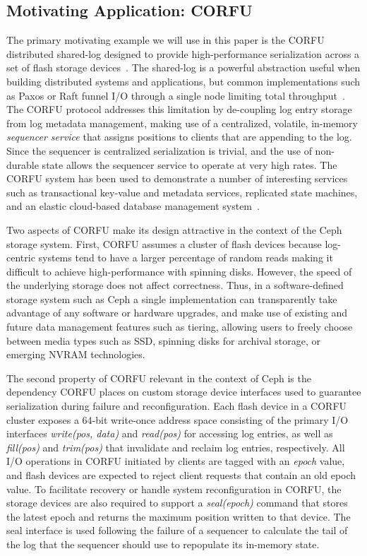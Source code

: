 \documentclass[10pt,twocolumn]{article}
\begin{document}
\subsection{Motivating Application: CORFU}

The primary motivating example we will use in this paper is the CORFU
distributed shared-log designed to provide high-performance serialization
across a set of flash storage devices~\cite{balakrishnan:nsdi12}. The
shared-log is a powerful abstraction useful when building distributed systems
and applications, but common implementations such as Paxos or Raft funnel I/O
through a single node limiting total throughput~\cite{lamport:tocs89}. The CORFU protocol addresses this limitation
by de-coupling log entry storage from log metadata management, making use of a
centralized, volatile, in-memory \emph{sequencer service} that assigns
positions to clients that are appending to the log. Since the sequencer is
centralized serialization is trivial, and the use of non-durable state allows
the sequencer service to operate at very high rates. The CORFU system has been
used to demonstrate a number of interesting services such as transactional
key-value and metadata services, replicated state machines, and an elastic
cloud-based database management system~\cite{balakrishnan:sosp13,bernstein:cidr11}.

Two aspects of CORFU make its design attractive in the context of the Ceph
storage system. First, CORFU assumes a cluster of flash devices because
log-centric systems tend to have a larger percentage of random reads making it
difficult to achieve high-performance with spinning disks. However, the speed
of the underlying storage does not affect correctness. Thus, in a
software-defined storage system such as Ceph a single implementation can
transparently take advantage of any software or hardware upgrades, and make use
of existing and future data management features such as tiering,
allowing users to freely choose between media types such as SSD, spinning
disks for archival storage, or emerging NVRAM technologies.

The second property of CORFU relevant in the context of Ceph is the dependency
CORFU places on custom storage device interfaces used to guarantee
serialization during failure and reconfiguration. Each flash device in a CORFU
cluster exposes a 64-bit write-once address space consisting of the primary I/O
interfaces \emph{write(pos, data)} and \emph{read(pos)} for accessing log
entries, as well as \emph{fill(pos)} and \emph{trim(pos)} that invalidate and
reclaim log entries, respectively. All I/O operations in CORFU initiated by
clients are tagged with an \emph{epoch} value, and flash devices are expected
to reject client requests that contain an old epoch value. To facilitate
recovery or handle system reconfiguration in CORFU, the storage devices are
also required to support a \emph{seal(epoch)} command that stores the latest
epoch and returns the maximum position written to that device. The seal
interface is used following the failure of a sequencer to calculate the tail of
the log that the sequencer should use to repopulate its in-memory state.
\end{document}
